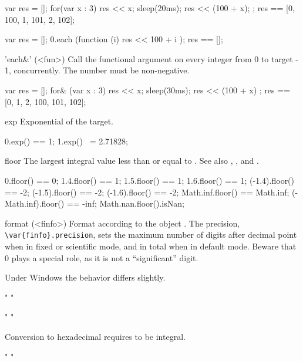 \begin{urbiscriptapi}
\begin{urbiassert}
{
  var res = [];
  for(var x : 3) { res << x; sleep(20ms); res << (100 + x); };
  res
}
== [0, 100, 1, 101, 2, 102];

{
  var res = [];
  0.each (function (i) { res << 100 + i });
  res
}
== [];
\end{urbiassert}


\item['each&'](<fun>)%
  Call the functional argument  on every integer from 0 to
  target - 1, concurrently.  The number must be non-negative.
\begin{urbiassert}
{
  var res = [];
  for& (var x : 3) { res << x; sleep(30ms); res << (100 + x) };
  res
}
== [0, 1, 2, 100, 101, 102];
\end{urbiassert}%


\item[exp]
  Exponential of the target.
\begin{urbiassert}
0.exp() == 1;
1.exp() ~= 2.71828;
\end{urbiassert}


\item[floor] The largest integral value less than or equal to \this.  See
  also , , and .
\begin{urbiassert}
     0.floor() ==  0;
   1.4.floor() ==  1;     1.5.floor() ==  1;    1.6.floor() ==  1;
(-1.4).floor() == -2;  (-1.5).floor() == -2; (-1.6).floor() == -2;
   Math.inf.floor() == Math.inf; (-Math.inf).floor() == -inf;
   Math.nan.floor().isNan;
\end{urbiassert}


\item[format](<finfo>)%
  Format according to the  object .
  The precision, \lstinline|\var{finfo}.precision|, sets the maximum
  number of digits after decimal point when in fixed or scientific
  mode, and in total when in default mode.  Beware that 0 plays a
  special role, as it is not a ``significant'' digit.

  \begin{windows}
    Under Windows the behavior differs slightly.
  \end{windows}
\begin{urbiassert}
"%
"%

"%
"%
\end{urbiassert}

  Conversion to hexadecimal requires \this to be integral.
\begin{urbiassert}
"%
"%


\end{urbiassert}
\end{urbiscriptapi}
